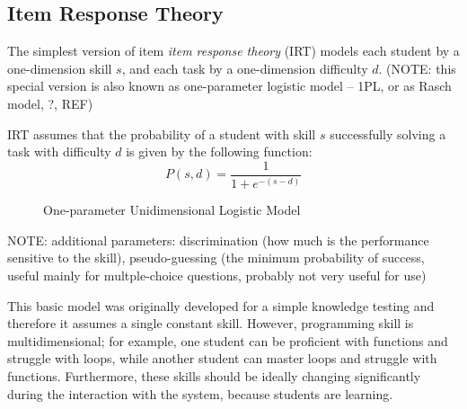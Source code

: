 
\subsection{Item Response Theory}
\label{sec:irt}

The simplest version of item \emph{item response theory} (IRT)
  \cite{irt-visual-guide}
  models each student by a one-dimension skill $s$,
  and each task by a one-dimension difficulty $d$.
(NOTE: this special version is also known as one-parameter logistic model -- 1PL, or as Rasch model, ?, REF)

IRT assumes that the probability of a student with skill $s$
  successfully solving a task with difficulty $d$
  is given by the following function:
  \begin{equation}\label{eq:logistic}
  P(s, d) = \frac{1}{1 + e^{-(s - d)}}
  \end{equation}

\begin{figure}[h]
  \centering
  \caption{One-parameter Unidimensional Logistic Model}
  \label{fig:logistic-model}
\end{figure}

NOTE: additional parameters: discrimination (how much is the performance sensitive to the skill), pseudo-guessing (the minimum probability of success, useful mainly for multple-choice questions, probably not very useful for use)

This basic model was originally developed for a simple knowledge testing
  and therefore it assumes a single constant skill.
However, programming skill is multidimensional;
  for example, one student can be proficient with functions and struggle with loops,
  while another student can master loops and struggle with functions.
Furthermore, these skills should be ideally changing significantly during
  the interaction with the system, because students are learning.


